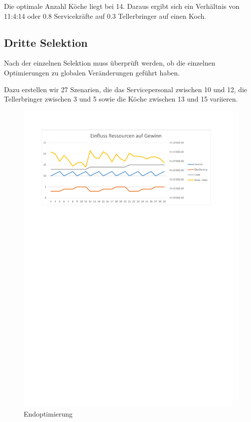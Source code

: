 \documentclass[ngerman,a4paper,12pt]{scrreprt}
\begin{document}
				Die optimale Anzahl Köche liegt bei 14. Daraus ergibt sich ein Verhältnis von 11:4:14 oder 0.8 Servicekräfte auf 0.3 Tellerbringer auf einen Koch.

		
		\subsection{Dritte Selektion}
			Nach der einzelnen Selektion muss überprüft werden, ob die einzelnen Optimierungen zu globalen Veränderungen geführt haben.
			
			Dazu erstellen wir 27 Szenarien, die das Servicepersonal zwischen 10 und 12, die Tellerbringer zwischen 3 und 5 sowie die Köche zwischen 13 und 15 variieren.
			
				\begin{figure}[H]
					\centering
						\includegraphics[trim=2cm 22.75cm 2.5cm 2cm, clip=true,width=\textwidth]{../Auswertung/4_+-1.pdf}
						\caption[Endoptimierung]{Endoptimierung}
						\label{Endoptimierung}
				\end{figure}	
			
\end{document}
